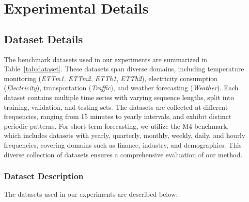 \section{Experimental Details}
\label{appx:experiment_details}

\subsection{Dataset Details}
\label{appx:dataset_details} 



The benchmark datasets used in our experiments are summarized in Table~\ref{tab:dataset}. These datasets span diverse domains, including temperature monitoring (\textit{ETTm1}, \textit{ETTm2}, \textit{ETTh1}, \textit{ETTh2}), electricity consumption (\textit{Electricity}), transportation (\textit{Traffic}), and weather forecasting (\textit{Weather}). Each dataset contains multiple time series with varying sequence lengths, split into training, validation, and testing sets. The datasets are collected at different frequencies, ranging from 15 minutes to yearly intervals, and exhibit distinct periodic patterns. For short-term forecasting, we utilize the M4 benchmark, which includes datasets with yearly, quarterly, monthly, weekly, daily, and hourly frequencies, covering domains such as finance, industry, and demographics. This diverse collection of datasets ensures a comprehensive evaluation of our method.

\subsubsection{Dataset Description}
\label{appx:dataset_description}

The datasets used in our experiments are described below:

